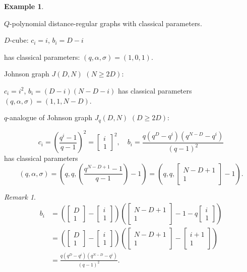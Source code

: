 \documentclass[
]{book}
\theoremstyle{definition}
\theoremstyle{definition}
\newtheorem{example}{Example}[chapter]
\theoremstyle{definition}
\theoremstyle{definition}
\theoremstyle{remark}
\newtheorem*{remark}{Remark}
\begin{document}
\begin{example}
\protect\hypertarget{exm:classical-parameters}{}\label{exm:classical-parameters}

\(Q\)-polynomial distance-regular graphs with classical parameters.

\(D\)-cube: \(c_i = i\), \(b_i = D-i\)

has classical parameters: \((q,\alpha, \sigma) = (1, 0, 1)\).

Johnson graph \(J(D,N)\) \((N\geq 2D)\):

\(c_i = i^2\), \(b_i = (D-i)(N-D-i)\)
has classical parameters \((q,\alpha, \sigma) = (1, 1, N-D)\).

\(q\)-analogue of Johnson graph \(J_q(D,N)\) \((D\geq 2D)\):

\[c_i = \left(\frac{q^i-1}{q-1}\right)^2 = \begin{bmatrix}{i}\\{1}\end{bmatrix}^2, \quad b_i = \frac{q(q^D-q^i)(q^{N-D}-q^i)}{(q-1)^2}\]
has classical parameters
\[(q,\alpha, \sigma) = \left(q, q, \left(\frac{q^{N-D+1}-1}{q-1}\right)-1\right) = \left(q, q, \begin{bmatrix}{N-D+1}\\{1}\end{bmatrix}-1\right).\]

\begin{remark}
\begin{align}
b_i & = \left(\begin{bmatrix}{D}\\{1}\end{bmatrix}-\begin{bmatrix}{i}\\{1}\end{bmatrix}\right)\left(\begin{bmatrix}{N-D+1}\\{1}\end{bmatrix}-1-q\begin{bmatrix}{i}\\{1}\end{bmatrix}\right)\\
& = \left(\begin{bmatrix}{D}\\{1}\end{bmatrix}-\begin{bmatrix}{i}\\{1}\end{bmatrix}\right)\left(\begin{bmatrix}{N-D+1}\\{1}\end{bmatrix}-\begin{bmatrix}{i+1}\\{1}\end{bmatrix}\right)\\
& = \frac{q(q^D-q^i)(q^{N-D}-q^i)}{(q-1)^2}.
\end{align}
\end{remark}

\end{example}
\end{document}
